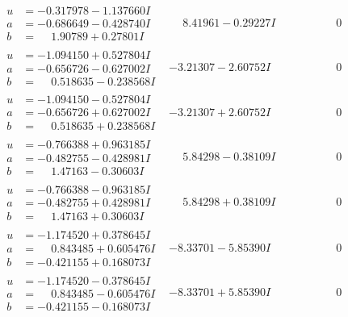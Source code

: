 \documentclass[1p]{elsarticle_modified}
\theoremstyle{definition}
\begin{document}
$$\begin{array}{c|c|c}
\begin{aligned}
u &= -0.317978 - 1.137660 I \\
a &= -0.686649 - 0.428740 I \\
b &= \phantom{-}1.90789 + 0.27801 I\end{aligned}
 & \phantom{-}8.41961 - 0.29227 I & \phantom{-0.000000 } 0 \\ \hline\begin{aligned}
u &= -1.094150 + 0.527804 I \\
a &= -0.656726 - 0.627002 I \\
b &= \phantom{-}0.518635 - 0.238568 I\end{aligned}
 & -3.21307 - 2.60752 I & \phantom{-0.000000 } 0 \\ \hline\begin{aligned}
u &= -1.094150 - 0.527804 I \\
a &= -0.656726 + 0.627002 I \\
b &= \phantom{-}0.518635 + 0.238568 I\end{aligned}
 & -3.21307 + 2.60752 I & \phantom{-0.000000 } 0 \\ \hline\begin{aligned}
u &= -0.766388 + 0.963185 I \\
a &= -0.482755 - 0.428981 I \\
b &= \phantom{-}1.47163 - 0.30603 I\end{aligned}
 & \phantom{-}5.84298 - 0.38109 I & \phantom{-0.000000 } 0 \\ \hline\begin{aligned}
u &= -0.766388 - 0.963185 I \\
a &= -0.482755 + 0.428981 I \\
b &= \phantom{-}1.47163 + 0.30603 I\end{aligned}
 & \phantom{-}5.84298 + 0.38109 I & \phantom{-0.000000 } 0 \\ \hline\begin{aligned}
u &= -1.174520 + 0.378645 I \\
a &= \phantom{-}0.843485 + 0.605476 I \\
b &= -0.421155 + 0.168073 I\end{aligned}
 & -8.33701 - 5.85390 I & \phantom{-0.000000 } 0 \\ \hline\begin{aligned}
u &= -1.174520 - 0.378645 I \\
a &= \phantom{-}0.843485 - 0.605476 I \\
b &= -0.421155 - 0.168073 I\end{aligned}
 & -8.33701 + 5.85390 I & \phantom{-0.000000 } 0 \\ \hline\begin{aligned}

\end{aligned}
\end{array}$$
\end{document}
